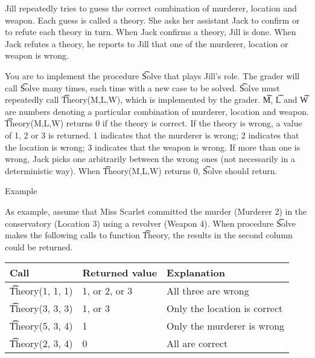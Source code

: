 Jill repeatedly tries to guess the correct combination of murderer, location and weapon. Each guess is called a theory. She asks her assistant Jack to confirm or to refute each theory in turn. When Jack confirms a theory, Jill is done. When Jack refutes a theory, he reports to Jill that one of the murderer, location or weapon is wrong.

You are to implement the procedure \t{Solve} that plays Jill's role. The grader will call \t{Solve} many times, each time with a new case to be solved. \t{Solve} must repeatedly call \t{Theory(M,L,W)}, which is implemented by the grader. \t{M}, \t{L} and \t{W} are numbers denoting a particular combination of murderer, location and weapon. \t{Theory(M,L,W)} returns 0 if the theory is correct. If the theory is wrong, a value of 1, 2 or 3 is returned. 1 indicates that the murderer is wrong; 2 indicates that the location is wrong; 3 indicates that the weapon is wrong. If more than one is wrong, Jack picks one arbitrarily between the wrong ones (not necessarily in a deterministic way). When \t{Theory(M,L,W)} returns 0, \t{Solve} should return.

Example

As example, assume that Miss Scarlet committed the murder (Murderer 2) in the conservatory (Location 3) using a revolver (Weapon 4). When procedure \t{Solve} makes the following calls to function \t{Theory}, the results in the second column could be returned.

\begin{tabular}{|l|l|l|}
\hline
Call & Returned value & Explanation \\ \hline
\t{Theory(1, 1, 1)} & 1, or 2, or 3 & All three are wrong \\ \hline
\t{Theory(3, 3, 3)} & 1, or 3 & Only the location is correct \\ \hline
\t{Theory(5, 3, 4)} & 1 & Only the murderer is wrong \\ \hline
\t{Theory(2, 3, 4)} & 0 & All are correct \\ \hline
\end{tabular}


